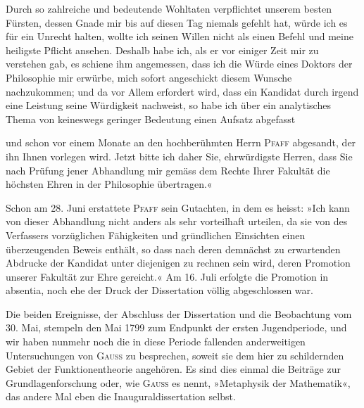 Durch so zahlreiche und bedeutende Wohltaten verpflichtet unserem besten
Fürsten, dessen Gnade mir bis auf diesen Tag niemals gefehlt hat, würde ich
es für ein Unrecht halten, wollte ich seinen Willen nicht als einen Befehl
und meine heiligste Pflicht ansehen. Deshalb habe ich, als er vor einiger Zeit
mir zu verstehen gab, es schiene ihm angemessen, dass ich die Würde eines
Doktors der Philosophie mir erwürbe, mich sofort angeschickt diesem Wunsche
nachzukommen; und da vor Allem erfordert wird, dass ein Kandidat durch
irgend eine Leistung seine Würdigkeit nachweist, so habe ich über ein analytisches
Thema von keineswegs geringer Bedeutung einen Aufsatz abgefasst\par
\clearpage{}
\noindent und schon vor einem Monate an den hochberühmten Herrn \textsc{Pfaff} abgesandt,
der ihn Ihnen vorlegen wird. Jetzt bitte ich daher Sie, ehrwürdigste Herren,
dass Sie nach Prüfung jener Abhandlung mir gemäss dem Rechte Ihrer Fakultät
die höchsten Ehren in der Philosophie übertragen.«

Schon am 28. Juni erstattete \textsc{Pfaff} sein Gutachten, in dem es heisst: »Ich
kann von dieser Abhandlung nicht anders als sehr vorteilhaft urteilen, da sie
von des Verfassers vorzüglichen Fähigkeiten und gründlichen Einsichten einen
überzeugenden Beweis enthält, so dass nach deren demnächst zu erwartenden
Abdrucke der Kandidat unter diejenigen zu rechnen sein wird, deren Promotion
unserer Fakultät zur Ehre gereicht.« Am 16. Juli erfolgte die Promotion
in absentia, noch ehe der Druck der Dissertation völlig abgeschlossen war.

Die beiden Ereignisse, der Abschluss der Dissertation und die Beobachtung
vom 30. Mai, stempeln den Mai 1799 zum Endpunkt der ersten
Jugendperiode, und wir haben nunmehr noch die in diese Periode fallenden
anderweitigen Untersuchungen von \textsc{Gauss} zu besprechen, soweit sie dem hier
zu schildernden Gebiet der Funktionentheorie angehören. Es sind dies einmal
die Beiträge zur Grundlagenforschung oder, wie \textsc{Gauss} es nennt, »Metaphysik
der Mathematik«, das andere Mal eben die Inauguraldissertation selbst.

